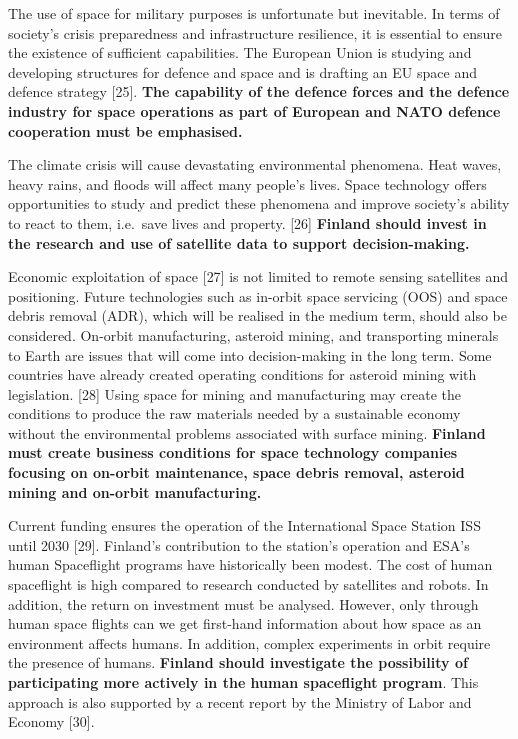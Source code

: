 \documentclass[nobib,finnish,oneside,openany,notoc,a4paper]{tufte-book}
\begin{document}
{The use of space for military purposes is unfortunate but inevitable.
In terms of society's crisis preparedness and infrastructure resilience,
it is essential to ensure the existence of sufficient capabilities.
The European Union is studying and developing structures for defence and
space and is drafting an EU space and defence strategy [25]. 
\textbf{The capability of the defence forces and the defence industry
for space operations as part of European and NATO defence cooperation
must be emphasised.}

The climate crisis will cause devastating environmental phenomena. Heat
waves, heavy rains, and floods will affect many people's lives. Space
technology offers opportunities to study and predict these phenomena and
improve society's ability to react to them, i.e.~save lives and
property. {[}26{]} \textbf{Finland should invest in the research and use
of satellite data to support decision-making.}

Economic exploitation of space {[}27{]} is not limited to remote sensing
satellites and positioning. Future technologies such as in-orbit space
servicing (OOS) and space debris removal (ADR), which will be realised
in the medium term, should also be considered. On-orbit manufacturing,
asteroid mining, and transporting minerals to Earth are issues that will
come into decision-making in the long term. Some countries have already
created operating conditions for asteroid mining with legislation.
{[}28{]} Using space for mining and manufacturing may create the
conditions to produce the raw materials needed by a sustainable economy
without the environmental problems associated with surface mining.
\textbf{Finland must create business conditions for space technology
companies focusing on on-orbit maintenance, space debris removal,
asteroid mining and on-orbit manufacturing.}

Current funding ensures the operation of the International Space Station
ISS until 2030 {[}29{]}. Finland's contribution to the station's
operation and ESA's human Spaceflight programs have historically been
modest. The cost of human spaceflight is high compared to research
conducted by satellites and robots. In addition, the return on
investment must be analysed. However, only through human space flights
can we get first-hand information about how space as an environment
affects humans. In addition, complex experiments in orbit require the
presence of humans. \textbf{Finland should investigate the possibility
of participating more actively in the human spaceflight program}. This
approach is also supported by a recent report by the Ministry of Labor
and Economy {[}30{]}.

}
\end{document}
